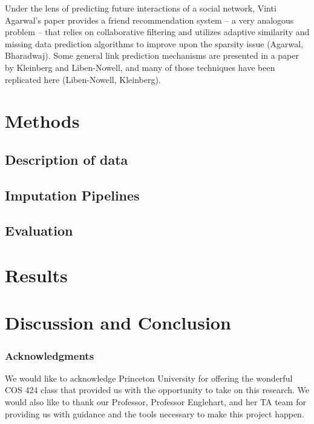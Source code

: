 \documentclass{article} %
\begin{document}
Under the lens of predicting future interactions of a social network, Vinti Agarwal's paper provides a friend recommendation system -- a very analogous problem -- that relies on collaborative filtering and utilizes adaptive similarity and missing data prediction algorithms to improve upon the sparsity issue (Agarwal, Bharadwaj). Some general link prediction mechanisms are presented in a paper by Kleinberg and Liben-Nowell, and many of those techniques have been replicated here (Liben-Nowell, Kleinberg).

\section{Methods}
\subsection{Description of data}
\subsection{Imputation Pipelines}
\subsection{Evaluation}
\section{Results}
\section{Discussion and Conclusion}
\subsubsection*{Acknowledgments}
We would like to acknowledge Princeton University for offering the wonderful COS 424 class that provided us with the opportunity to take on this research. We would also like to thank our Professor, Professor Englehart, and her TA team for providing us with guidance and the tools necessary to make this project happen.


\end{document}
